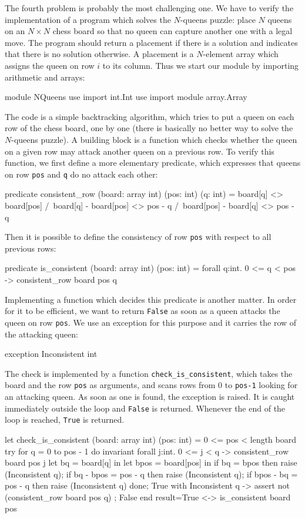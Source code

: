 The fourth problem is probably the most challenging one.
We have to verify the implementation of a program which solves the
$N$-queens puzzle: place $N$ queens on an $N \times N$
chess board so that no queen can capture another one with a
legal move.
The program should return a placement if there is a solution and
indicates that there is no solution otherwise. A placement is a
$N$-element array which assigns the queen on row $i$ to its column.
Thus we start our module by importing arithmetic and arrays:
\begin{whycode}
module NQueens
  use import int.Int
  use import module array.Array
\end{whycode}
The code is a simple backtracking algorithm, which tries to put a queen
on each row of the chess board, one by one (there is basically no
better way to solve the $N$-queens puzzle).
A building block is a function which checks whether the queen on a
given row may attack another queen on a previous row. To verify this
function, we first define a more elementary predicate, which expresses
that queens on row \texttt{pos} and \texttt{q} do no attack each other:
\begin{whycode}
  predicate consistent_row (board: array int) (pos: int) (q: int) =
    board[q] <> board[pos] /\
    board[q] - board[pos] <> pos - q /\
    board[pos] - board[q] <> pos - q
\end{whycode}
Then it is possible to define the consistency of row \texttt{pos}
with respect to all previous rows:
\begin{whycode}
  predicate is_consistent (board: array int) (pos: int) =
    forall q:int. 0 <= q < pos -> consistent_row board pos q
\end{whycode}
Implementing a function which decides this predicate is another
matter. In order for it to be efficient, we want to return
\texttt{False} as soon as a queen attacks the queen on row
\texttt{pos}. We use an exception for this purpose and it carries the
row of the attacking queen:
\begin{whycode}
  exception Inconsistent int
\end{whycode}
The check is implemented by a function \verb|check_is_consistent|,
which takes the board and the row \texttt{pos} as arguments, and scans
rows from 0 to \texttt{pos-1} looking for an attacking queen. As soon
as one is found, the exception is raised. It is caught immediately
outside the loop and \texttt{False} is returned. Whenever the end of
the loop is reached, \texttt{True} is returned.
\begin{whycode}
  let check_is_consistent (board: array int) (pos: int) =
    { 0 <= pos < length board }
    try
      for q = 0 to pos - 1 do
        invariant {
          forall j:int. 0 <= j < q -> consistent_row board pos j
        }
        let bq   = board[q]   in
        let bpos = board[pos] in
        if bq        = bpos    then raise (Inconsistent q);
        if bq - bpos = pos - q then raise (Inconsistent q);
        if bpos - bq = pos - q then raise (Inconsistent q)
      done;
      True
    with Inconsistent q ->
      assert { not (consistent_row board pos q) };
      False
    end
    { result=True <-> is_consistent board pos }
\end{whycode}
